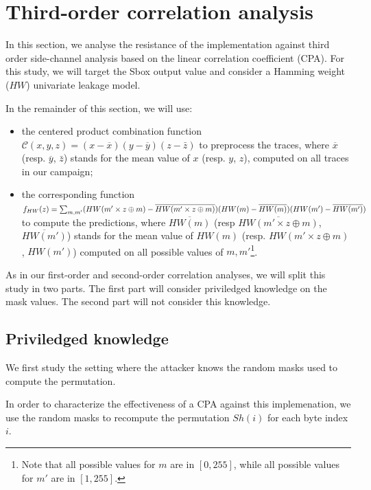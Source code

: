 \section{Third-order correlation analysis}

In this section, we analyse the resistance of the implementation against third order side-channel analysis based on the linear correlation coefficient (CPA). For this study, we will target the Sbox output value and consider a Hamming weight ($HW$) univariate leakage model.

In the remainder of this section, we will use:
\begin{itemize}

\item the centered product combination function $\mathcal{C}(x,y,z) = (x-\overline{x})(y-\overline{y})(z-\bar{z})$ to preprocess the traces, where $\overline{x}$ (resp. $\overline{y}$, $\bar{z}$) stands for the mean value of $x$ (resp. $y$, $z$), computed on all traces in our campaign; 

\item the corresponding function $f_{HW}(z) = \sum_{m,m'} (HW(m'\times z \oplus m) -\\ \overline{HW(m'\times z\oplus m)})(HW(m)-\overline{HW(m)})(HW(m')-\overline{HW(m')})$ to compute the predictions, where $\overline{HW(m)}$ (resp $\overline{HW(m'\times z \oplus m)}$, $\overline{HW(m')}$) stands for the mean value of $HW(m)$ (resp. $HW(m' \times z\oplus m)$, $HW(m')$) computed on all possible values of $m,m'$\footnote{Note that all possible values for $m$ are in $[0,255]$, while all possible values for $m'$ are in $[1,255]$.}.
\end{itemize}

As in our first-order and second-order correlation analyses, we will split this study in two parts. The first part will consider priviledged knowledge on the mask values. The second part will not consider this knowledge.

\subsection{Priviledged knowledge}
We first study the setting where the attacker knows the random masks used to compute the permutation. 

In order to characterize the effectiveness of a CPA against this implemenation, we use the random masks to recompute the permutation $Sh(i)$ for each byte index $i$.

